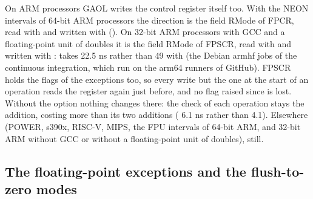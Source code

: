 \documentclass[12pt,a4paper,twoside,openright]{book}
\begin{document}
\medskip
On ARM processors GAOL writes the control register itself too. With the NEON
intervals of 64-bit ARM processors the direction is the field RMode of FPCR,
read with  and written with  (). On
32-bit ARM processors with GCC and a floating-point unit of doubles it is the
field RMode of FPSCR, read with  and written with :
 takes 22.5 ns rather than 49 with 
(the Debian armhf jobs of the continuous integration, which run on the arm64
runners of GitHub). FPSCR holds the flags of the exceptions too, so every
write but the one at the start of an operation reads the register again just
before, and no flag raised since is lost. Without the option nothing changes
there: the check of each operation stays the addition,  costing
more than its two additions ( 6.1 ns rather than 4.1). Elsewhere
(POWER, s390x, RISC-V, MIPS, the FPU intervals of 64-bit ARM, and 32-bit ARM
without GCC or without a floating-point unit of doubles), 
still.

\subsection{The floating-point exceptions and the flush-to-zero modes}
\label{sec:changes-exceptions}
%
\end{document}
